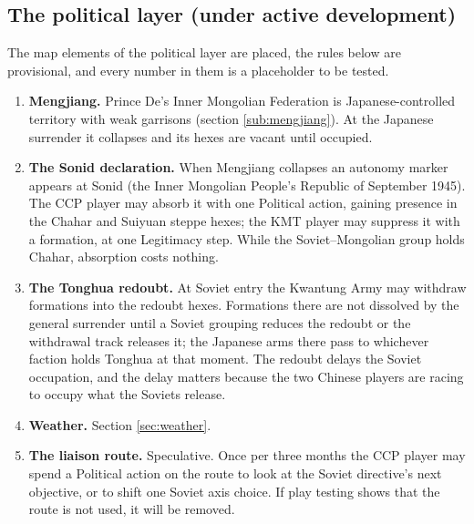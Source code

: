 \documentclass[11pt]{article}
\begin{document}
\subsection{The political layer (under active development)}\label{sub:political}
The map elements of the political layer are placed, the rules below are provisional, and every number in them is a placeholder to be tested.
\begin{enumerate}
\item \textbf{Mengjiang.} Prince De's Inner Mongolian Federation is Japanese-controlled territory with weak garrisons (section \ref{sub:mengjiang}). At the Japanese surrender it collapses and its hexes are vacant until occupied.
\item \textbf{The Sonid declaration.} When Mengjiang collapses an autonomy marker appears at Sonid (the Inner Mongolian People's Republic of September 1945). The CCP player may absorb it with one Political action, gaining presence in the Chahar and Suiyuan steppe hexes; the KMT player may suppress it with a formation, at one Legitimacy step. While the Soviet--Mongolian group holds Chahar, absorption costs nothing.
\item \textbf{The Tonghua redoubt.} At Soviet entry the Kwantung Army may withdraw formations into the redoubt hexes. Formations there are not dissolved by the general surrender until a Soviet grouping reduces the redoubt or the withdrawal track releases it; the Japanese arms there pass to whichever faction holds Tonghua at that moment. The redoubt delays the Soviet occupation, and the delay matters because the two Chinese players are racing to occupy what the Soviets release.
\item \textbf{Weather.} Section \ref{sec:weather}.
\item \textbf{The liaison route.} Speculative. Once per three months the CCP player may spend a Political action on the route to look at the Soviet directive's next objective, or to shift one Soviet axis choice. If play testing shows that the route is not used, it will be removed.
\end{enumerate}

\end{document}
